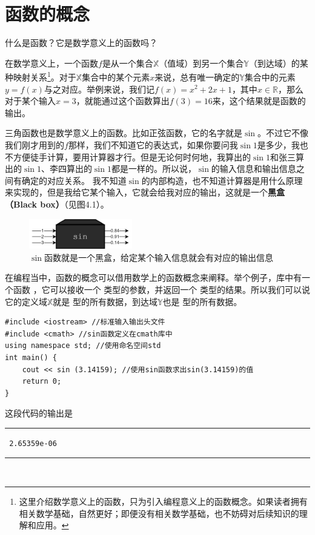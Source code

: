 \section{函数的概念}
什么是函数？它是数学意义上的函数吗？\par
在数学意义上，一个函数$f$是从一个集合$\mathbb{X}$（值域）到另一个集合$\mathbb{Y}$（到达域）的某种映射关系\footnote{这里介绍数学意义上的函数，只为引入编程意义上的函数概念。如果读者拥有相关数学基础，自然更好；即便没有相关数学基础，也不妨碍对后续知识的理解和应用。}。对于$\mathbb{X}$集合中的某个元素$x$来说，总有唯一确定的$\mathbb{Y}$集合中的元素$y=f(x)$与之对应。举例来说，我们记$f(x)=x^2+2x+1$，其中$x\in\mathbb{R}$，那么对于某个输入$x=3$，就能通过这个函数算出$f(3)=16$来，这个结果就是函数的输出。\par
三角函数也是数学意义上的函数。比如正弦函数，它的名字就是$\sin$。不过它不像我们刚才用到的$f$那样，我们不知道它的表达式，如果你要问我$\sin1$是多少，我也不方便徒手计算，要用计算器才行。但是无论何时何地，我算出的$\sin1$和张三算出的$\sin1$、李四算出的$\sin1$都是一样的。所以说，$\sin$的输入信息和输出信息之间有确定的对应关系。
我不知道$\sin$的内部构造，也不知道计算器是用什么原理来实现的，但是我给它某个输入，它就会给我对应的输出，这就是一个\textbf{黑盒（Black box）}（见图4.1）。\par
\begin{figure}[htbp]
    \centering
    \includegraphics[width=0.4\textwidth]{../images/generalized_parts/04_black_box.png}
    \caption{$\sin$函数就是一个黑盒，给定某个输入信息就会有对应的输出信息}
\end{figure}
在编程当中，函数的概念可以借用数学上的函数概念来阐释。举个例子，\lstinline@cmath@ 库中有一个函数 \lstinline@sin@，它可以接收一个 \lstinline@double@ 类型的参数，并返回一个 \lstinline@double@ 类型的结果。所以我们可以说它的定义域$\mathbb{X}$就是 \lstinline@double@ 型的所有数据，到达域$\mathbb{Y}$也是 \lstinline@double@ 型的所有数据。\par
\begin{lstlisting}
#include <iostream> //标准输入输出头文件
#include <cmath> //sin函数定义在cmath库中
using namespace std; //使用命名空间std
int main() {
    cout << sin (3.14159); //使用sin函数求出sin(3.14159)的值
    return 0;
}
\end{lstlisting}
这段代码的输出是\\\noindent\rule{\textwidth}{0.2pt}\texttt{
2.65359e-06
}\\\noindent\rule{\textwidth}{0.2pt}\\
